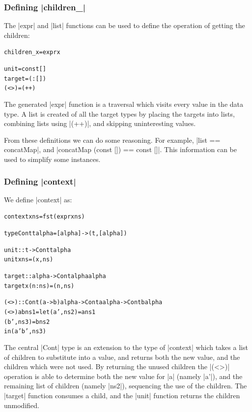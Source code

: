 \documentclass[preprint]{sigplanconf}
\newenvironment{code}{\begin{alltt}\small}{\end{alltt}}
\begin{document}

\subsubsection{Defining |children_|}

The |expr| and |list| functions can be used to define the operation of getting the children:

\begin{code}
children_ x = expr x

unit    = const []
target  = (:[])
(<>)    = (++)
\end{code}

The generated |expr| function is a traversal which visits every value in the data type. A list is created of all the target types by placing the targets into lists, combining lists using |(++)|, and skipping uninteresting values.

From these definitions we can do some reasoning. For example, |list == concatMap|, and |concatMap (const []) == const []|. This information can be used to simplify some instances.

\subsubsection{Defining |context|}

We define |context| as:

\begin{code}
context x ns = fst (expr x ns)

type Cont t alpha = [alpha] -> (t,[alpha])

unit :: t -> Cont t alpha
unit x ns = (x,ns)

target :: alpha -> Cont alpha alpha
target x (n:ns) = (n,ns)

(<>) :: Cont (a->b) alpha -> Cont a alpha -> Cont b alpha
(<>) a b ns1 =  let  (a'  ,ns2  ) = a  ns1
                     (b'  ,ns3  ) = b  ns2
                in   (a' b',ns3)
\end{code}

The central |Cont| type is an extension to the type of |context| which takes a list of children to substitute into a value, and returns both the new value, and the children which were not used. By returning the unused children the |(<>)| operation is able to determine both the new value for |a| (namely |a'|), and the remaining list of children (namely |ns2|), sequencing the use of the children. The |target| function consumes a child, and the |unit| function returns the children unmodified.
\end{document}
